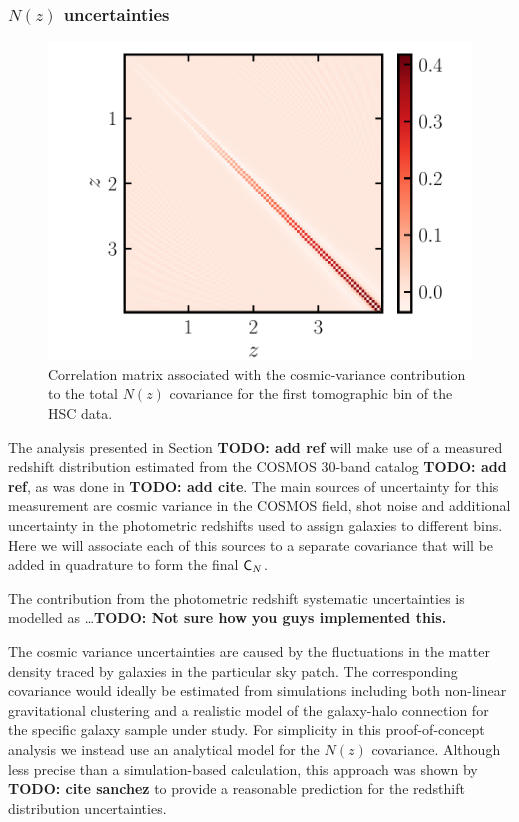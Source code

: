 \documentclass[a4paper,11pt]{article}
\newcommand{\todo}[1]{{\bf TODO: #1}}
\begin{document}
      \subsubsection{$N(z)$ uncertainties}\label{sssec:theory.prior.cv}
        \begin{figure}[ht]
          \centering  
          \includegraphics[width=1.\textwidth]{./corr_CV_0}
          \caption{Correlation matrix associated with the cosmic-variance contribution to the total $N(z)$ covariance for the first tomographic bin of the HSC data.}\label{fig:CV}
        \end{figure}
        The analysis presented in Section \todo{add ref} will make use of a measured redshift distribution estimated from the COSMOS 30-band catalog \todo{add ref}, as was done in \todo{add cite}. The main sources of uncertainty for this measurement are cosmic variance in the COSMOS field, shot noise and additional uncertainty in the photometric redshifts used to assign galaxies to different bins. Here we will associate each of this sources to a separate covariance that will be added in quadrature to form the final ${\sf C}_N$.
        
        The contribution from the photometric redshift systematic uncertainties is modelled as \ldots\todo{Not sure how you guys implemented this.}
        
        The cosmic variance uncertainties are caused by the fluctuations in the matter density traced by galaxies in the particular sky patch. The corresponding covariance would ideally be estimated from simulations including both non-linear gravitational clustering and a realistic model of the galaxy-halo connection for the specific galaxy sample under study. For simplicity in this proof-of-concept analysis we instead use an analytical model for the $N(z)$ covariance. Although less precise than a simulation-based calculation, this approach was shown by \todo{cite sanchez} to provide a reasonable prediction for the redsthift distribution uncertainties.
\end{document}
